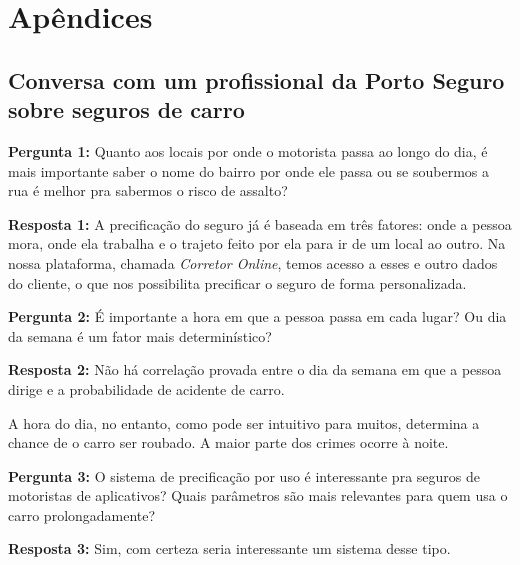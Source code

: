 \chapter{Apêndices}




\section{Conversa com um profissional da Porto Seguro sobre seguros de carro}


\noindent
\textbf{Pergunta 1:} 
Quanto aos locais por onde o motorista passa ao longo do dia, é mais importante saber o nome do bairro por onde ele passa ou se soubermos a rua é melhor pra sabermos o risco de assalto?

\noindent
\textbf{Resposta 1:} 
A precificação do seguro já é baseada em três fatores: onde a pessoa mora, onde ela trabalha e o trajeto feito por ela para ir de um local ao outro.
Na nossa plataforma, chamada \textit{Corretor Online}, temos acesso a esses e outro dados do cliente, o que nos possibilita precificar o seguro de forma personalizada.


\noindent
\textbf{Pergunta 2:} 
É importante a hora em que a pessoa passa em cada lugar? Ou dia da semana é um fator mais determinístico?

\noindent
\textbf{Resposta 2:}
Não há correlação provada entre o dia da semana em que a pessoa dirige e a probabilidade de acidente de carro.

A hora do dia, no entanto, como pode ser intuitivo para muitos, determina a chance de o carro ser roubado. A maior parte dos crimes ocorre à noite.





\noindent
\textbf{Pergunta 3:} O sistema de precificação por uso é interessante pra seguros de motoristas de aplicativos? Quais parâmetros são mais relevantes para quem usa o carro prolongadamente?

\noindent
\textbf{Resposta 3:}
Sim, com certeza seria interessante um sistema desse tipo.


